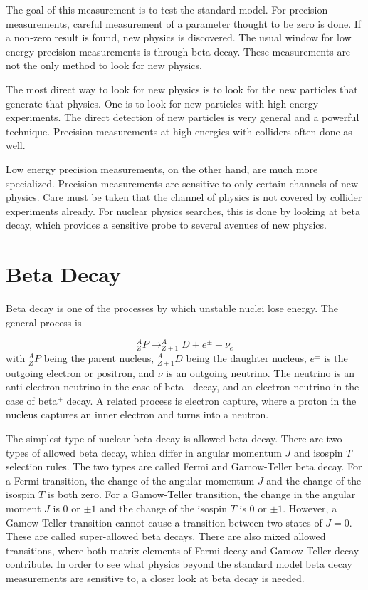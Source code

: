 \documentclass[../MaxHughesThesis.tex]{subfiles}
\begin{document}
The goal of this measurement is to test the standard model.
For precision measurements, careful measurement of a parameter thought to be zero is done.
If a non-zero result is found, new physics is discovered.
The usual window for low energy precision measurements is through beta decay.
These measurements are not the only method to look for new physics.

The most direct way to look for new physics is to look for the new particles that generate that physics.
One is to look for new particles with high energy experiments. 
The direct detection of new particles is very general and a powerful technique.
Precision measurements at high energies with colliders often done as well. 
 
Low energy precision measurements, on the other hand, are much more specialized.
Precision measurements are sensitive to only certain channels of new physics.
Care must be taken that the channel of physics is not covered by collider experiments already.
For nuclear physics searches, this is done by looking at beta decay, which provides a sensitive probe to several avenues of new physics.

\section{Beta Decay}
Beta decay is one of the processes by which unstable nuclei lose energy.
The general process is %

\begin{equation}
	\label{eq:betadecay}
	^{A}_{Z}P \rightarrow ^{A}_{Z\pm 1}D + e^{\pm} + \nu_{e}
\end{equation}
with $^{A}_{Z}P$ being the parent nucleus, $^{A}_{Z \pm 1}D$ being the daughter nucleus, $e^{\pm}$ is the outgoing electron or positron, and $\nu$ is an outgoing neutrino.
The neutrino is an anti-electron neutrino in the case of beta$^{-}$ decay, and an electron neutrino in the case of beta$^{+}$ decay. 
A related process is electron capture, where a proton in the nucleus captures an inner electron and turns into a neutron.

The simplest type of nuclear beta decay is allowed beta decay.
There are two types of allowed beta decay, which differ in angular momentum $J$ and isospin $T$ selection rules.
The two types are called Fermi and Gamow-Teller beta decay. 
For a Fermi transition, the change of the angular momentum $J$ and the change of the isospin $T$ is both zero.
For a Gamow-Teller transition, the change in the angular moment $J$ is $0$ or $\pm1$ and the change of the isospin $T$ is $0$ or $\pm 1$.
However, a Gamow-Teller transition cannot cause a transition between two states of $J = 0$. 
These are called super-allowed beta decays.
There are also mixed allowed transitions, where both matrix elements of Fermi decay and Gamow Teller decay contribute.
In order to see what physics beyond the standard model beta decay measurements are sensitive to, a closer look at beta decay is needed.
\end{document}

